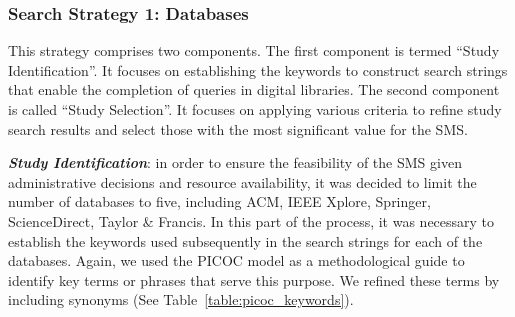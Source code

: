 
\newcommand{\acm}{518}
\newcommand{\ieee}{0}
\newcommand{\sd}{120}
\newcommand{\spr}{209}
\newcommand{\tf}{0}
\newcommand{\tot}{847}
\newcommand{\acmp}{\fpeval{round(\acm*100/\tot,2)}}
\newcommand{\ieeep}{\fpeval{round(\ieee*100/\tot,2)}}
\newcommand{\sdp}{\fpeval{round(\sd*100/\tot,2)}}
\newcommand{\sprp}{\fpeval{round(\spr*100/\tot,2)}}
\newcommand{\tfp}{\fpeval{round(\tf*100/\tot,2)}}


\newcommand{\iacm}{315}
\newcommand{\iieee}{0}
\newcommand{\isd}{101}
\newcommand{\ispr}{63}
\newcommand{\itf}{0}
\newcommand{\itot}{479}
\newcommand{\iacmp}{\fpeval{round(\iacm*100/\itot,2)}}
\newcommand{\iieeep}{\fpeval{round(\iieee*100/\itot,2)}}
\newcommand{\isdp}{\fpeval{round(\isd*100/\itot,2)}}
\newcommand{\isprp}{\fpeval{round(\ispr*100/\itot,2)}}
\newcommand{\itfp}{\fpeval{round(\itf*100/\itot,2)}}

\newcommand{\numEstEx}{3}

\newcommand{\depTot}{\fpeval{\itot-\numEstEx}}

\newcommand{\screen}{377}
\newcommand{\screenTot}{\fpeval{\depTot-\screen}}

\subsubsection{Search Strategy 1: Databases}

This strategy comprises two components. The first component is termed ``Study Identification''. It focuses on establishing the keywords to construct search strings that enable the completion of queries in digital libraries. The second component is called ``Study Selection''. It focuses on applying various criteria to refine study search results and select those with the most significant value for the SMS\@.

\textit{\textbf{Study Identification}}: in order to ensure the feasibility of the SMS given administrative decisions and resource availability, it was decided to limit the number of databases to five, including ACM, IEEE Xplore, Springer, ScienceDirect, Taylor \& Francis. In this part of the process, it was necessary to establish the keywords used subsequently in the search strings for each of the databases. Again, we used the PICOC model as a methodological guide to identify key terms or phrases that serve this purpose. We refined these terms by including synonyms (See Table~\ref{table:picoc_keywords}).

